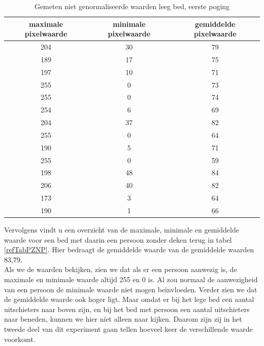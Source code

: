 \begin{table}[h]
	\begin{tabular}{|c|c|c|}
		\hline
		maximale pixelwaarde & minimale pixelwaarde & gemiddelde pixelwaarde \\ \hline
		204 & 30 & 79 \\ \hline
		189 & 17 & 75 \\ \hline
		197 & 10 & 71 \\ \hline
		255 & 0 & 73 \\ \hline
		255 & 0 & 74 \\ \hline
		254 & 6 & 69 \\ \hline
		204 & 37 & 82 \\ \hline
		255 & 0 & 64 \\ \hline
		190 & 5 & 71 \\ \hline
		255 & 0 & 59 \\ \hline
		198 & 48 & 84 \\ \hline
		206 & 40 & 82 \\ \hline
		173 & 3 & 64 \\ \hline
		190 & 1 & 66 \\ \hline
        
	\end{tabular}
	\caption{Gemeten niet genormaliseerde waarden leeg bed, eerste poging}
	\label{refTabPZNL}
\end{table}
Vervolgens vindt u een overzicht van de maximale, minimale en gemiddelde waarde voor een bed met daarin een persoon zonder deken terug in tabel \ref{refTabPZNP}. Hier bedraagt de gemiddelde waarde van de gemiddelde waarden 83,79. \\
Als we de waarden bekijken, zien we dat als er een persoon aanwezig is, de maximale en minimale waarde altijd 255 en 0 is. Al zou normaal de aanwezigheid van een persoon de minimale waarde niet mogen be\"invloeden. Verder zien we dat de gemiddelde waarde ook hoger ligt. Maar omdat er bij het lege bed een aantal uitschieters naar boven zijn, en bij het bed met persoon een aantal uitschieters naar beneden, kunnen we hier niet alleen naar kijken. Daarom zijn zij in het tweede deel van dit experiment gaan tellen hoeveel keer de verschillende waarde voorkomt.

